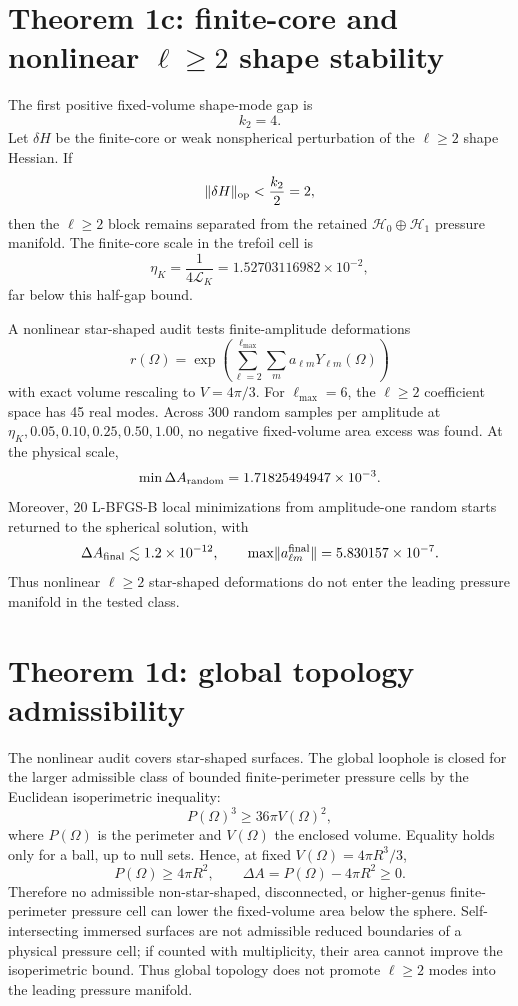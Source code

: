 \documentclass[11pt]{article}
\begin{document}
\section{Theorem 1c: finite-core and nonlinear \(\ell\ge2\) shape stability}

The first positive fixed-volume shape-mode gap is
\[
  k_2=4.
\]
Let \(\delta H\) be the finite-core or weak nonspherical perturbation of the
\(\ell\ge2\) shape Hessian.  If
\[
  \|\delta H\|_{\rm op}<\frac{k_2}{2}=2,
\]
then the \(\ell\ge2\) block remains separated from the retained
\(\mathcal H_0\oplus\mathcal H_1\) pressure manifold.  The finite-core scale in
the trefoil cell is
\[
  \eta_K=\frac{1}{4\mathcal L_K}=1.52703116982\times10^{-2},
\]
far below this half-gap bound.

A nonlinear star-shaped audit tests finite-amplitude deformations
\[
  r(\Omega)=
  \exp\!\left(
  \sum_{\ell=2}^{\ell_{\max}}\sum_m a_{\ell m}Y_{\ell m}(\Omega)
  \right)
\]
with exact volume rescaling to \(V=4\pi/3\).  For \(\ell_{\max}=6\), the
\(\ell\ge2\) coefficient space has 45 real modes.  Across 300 random samples
per amplitude at \(\eta_K,0.05,0.10,0.25,0.50,1.00\), no negative fixed-volume
area excess was found.  At the physical scale,
\[
  \min\Delta A_{\rm random}=1.71825494947\times10^{-3}.
\]
Moreover, 20 L-BFGS-B local minimizations from amplitude-one random starts
returned to the spherical solution, with
\[
  \Delta A_{\rm final}\lesssim 1.2\times10^{-12},
  \qquad
  \max\lVert a_{\ell m}^{\rm final}\rVert
  =
  5.830157\times10^{-7}.
\]
Thus nonlinear \(\ell\ge2\) star-shaped deformations do not enter the leading
pressure manifold in the tested class.

\section{Theorem 1d: global topology admissibility}

The nonlinear audit covers star-shaped surfaces.  The global loophole is closed
for the larger admissible class of bounded finite-perimeter pressure cells by
the Euclidean isoperimetric inequality:
\[
  P(\Omega)^3\ge 36\pi V(\Omega)^2,
\]
where \(P(\Omega)\) is the perimeter and \(V(\Omega)\) the enclosed volume.
Equality holds only for a ball, up to null sets.  Hence, at fixed
\(V(\Omega)=4\pi R^3/3\),
\[
  P(\Omega)\ge 4\pi R^2,
  \qquad
  \Delta A=P(\Omega)-4\pi R^2\ge0.
\]
Therefore no admissible non-star-shaped, disconnected, or higher-genus
finite-perimeter pressure cell can lower the fixed-volume area below the
sphere.  Self-intersecting immersed surfaces are not admissible reduced
boundaries of a physical pressure cell; if counted with multiplicity, their
area cannot improve the isoperimetric bound.  Thus global topology does not
promote \(\ell\ge2\) modes into the leading pressure manifold.
\end{document}
